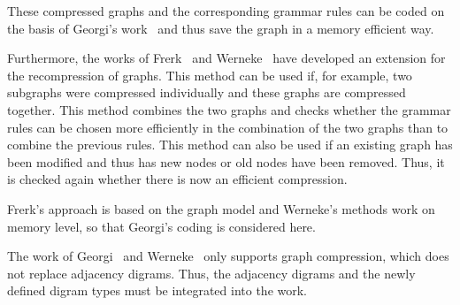 \documentclass[a4paper]{scrartcl}
\begin{document}
These compressed graphs and the corresponding grammar rules can be coded on the basis of Georgi's work~\cite{georgi} and thus save the graph in a memory efficient way. 

Furthermore, the works of Frerk~\cite{pfrerk} and Werneke~\cite{werneke} have developed an extension for the recompression of graphs. This method can be used if, for example, two subgraphs were compressed individually and these graphs are compressed together. This method combines the two graphs and checks whether the grammar rules can be chosen more efficiently in the combination of the two graphs than to combine the previous rules. This method can also be used if an existing graph has been modified and thus has new nodes or old nodes have been removed. Thus, it is checked again whether there is now an efficient compression.

Frerk's approach is based on the graph model and Werneke's methods work on memory level, so that Georgi's coding is considered here.

The work of Georgi~\cite{georgi} and Werneke~\cite{werneke} only supports graph compression, which does not replace adjacency digrams. Thus, the adjacency digrams and the newly defined digram types must be integrated into the work.

\pagebreak
\printbibliography
\end{document}

